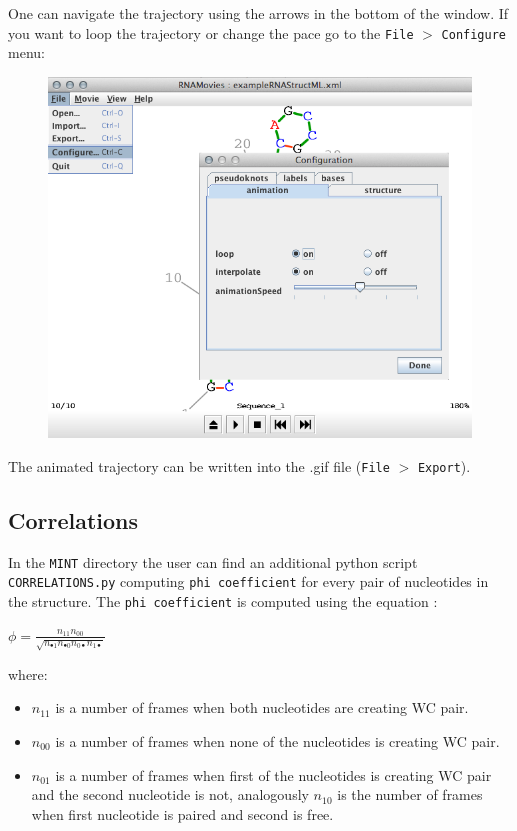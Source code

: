 \documentclass[12pt]{article}
\begin{document}
One can navigate the trajectory using the arrows in the bottom of the window. If you want to loop the trajectory or change the pace go to the \texttt{File} $>$ \texttt{Configure} menu: 
\begin{figure}[h!]
\centering
\includegraphics[scale=0.4]{./pictures/RNAmovies_3.png}
\end{figure}
\newpage
The animated trajectory can be written into the .gif file  (\texttt{File} $>$ \texttt{Export}).

\subsection{Correlations}\label{CorrelationsParagraph}
In the \texttt{MINT} directory the user can find an additional python script \texttt{CORRELATIONS.py} computing \texttt{phi coefficient} for every pair of nucleotides in the structure. The \texttt{phi coefficient} is computed using the equation \cite{Everitt1977}:
\begin{center}
\begin{large}
$ \phi = \frac{n_{11}n_{00}}{\sqrt{n_{\bullet1}n_{\bullet0} n_{0\bullet}n_{1\bullet}}}$
\end{large}
\end{center}

where:
\begin{itemize}
\item $n_{11}$ is a number of frames when both nucleotides are creating WC pair.
\item $n_{00}$ is a number of frames when none of the nucleotides is creating WC pair.
\item $n_{01}$ is a number of frames when first of the nucleotides is creating WC pair and the second nucleotide is not, analogously $n_{10}$ is the number of frames when first nucleotide is paired and second is free.
\end{itemize}
\end{document}
